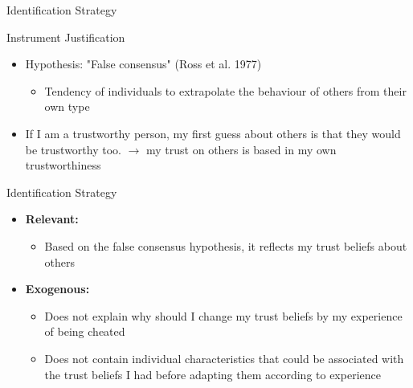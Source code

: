 \documentclass[pdftex,12pt,xcolor=pdftex,table]{beamer}
\begin{document}
\begin{frame}{Identification Strategy}
    \begin{center}
        \begin{description}
         \Large \item[Instrument Justification]
        \end{description}
    \end{center}
    \begin{itemize}
        \item Hypothesis: "False consensus" (Ross et al. 1977)
            \begin{itemize}
                \item Tendency of individuals to extrapolate the behaviour of others from their own type
            \end{itemize}
        \item If I am a trustworthy person, my first guess about others is that they would be trustworthy too. $\to$ my trust on others is based in my own trustworthiness 
    \end{itemize}
\end{frame}
\begin{frame}{Identification Strategy}
    \begin{center}
        \begin{description}
         \Large \item[Instrument Justification]
        \end{description}
    \end{center}
    \begin{itemize}
        \item \textbf{Relevant:}
           \begin{itemize}
               \item Based on the false consensus hypothesis, it reflects my trust beliefs about others
           \end{itemize} \pause
        \item \textbf{Exogenous:}
           \begin{itemize}
               \item Does not explain why should I change my trust beliefs by my experience of being cheated 
               \item Does not contain individual characteristics that could be associated with the trust beliefs I had before adapting them according to experience
        \end{itemize} \pause
    \end{itemize}
\end{frame}
\end{document}
